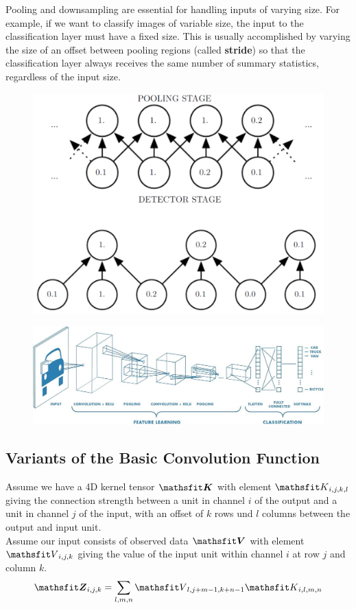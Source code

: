 \begin{multicols}{2}
\begin{figure}[H]
	\end{figure}
	Pooling and downsampling are essential for handling inputs of varying size.
	For example, if we want to classify images of variable size, the input to the classification layer must have a fixed size.
	This is usually accomplished by varying the size of an offset between pooling regions (called \textbf{stride}) so that the classification layer always receives the same number of summary statistics, regardless of the input size.
	\begin{figure}[H]
		\centering
		\includegraphics[width=0.8\linewidth]{images/stride.PNG}
	\end{figure}
	\begin{figure}[H]
		\centering
		\includegraphics[width=0.9\linewidth]{images/cnn_arch.jpg}
	\end{figure}
	\newpage
	\subsection{Variants of the Basic Convolution Function}
	Assume we have a 4D kernel tensor $\tK$ with element $\etK_{i,j,k,l}$ giving the connection strength between a unit in channel $i$ of the output and a unit in channel $j$ of the input, with an offset of $k$ rows und $l$ columns between the output and input unit.\\
	Assume our input consists of observed data $\tV$ with element $\etV_{i,j,k}$ giving the value of the input unit within channel $i$ at row $j$ and column $k$.
	\[ \tZ_{i,j,k} = \sum_{l,m,n} \etV_{l,j+m-1,k+n-1} \etK_{i,l,m,n} \]
	

\end{multicols}
